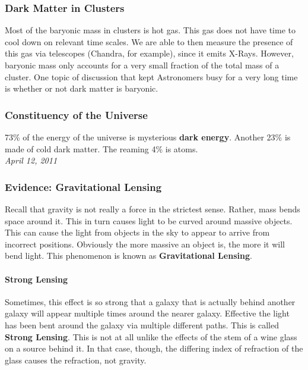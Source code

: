 \documentclass{article}
\begin{document}
	\subsubsection{Dark Matter in Clusters}
		Most of the baryonic mass in clusters is hot gas. This gas does not have time to cool down on relevant time scales. We are able to then measure the presence of this gas via telescopes (Chandra, for example), since it emits X-Rays. However, baryonic mass only accounts for a very small fraction of the total mass of a cluster. One topic of discussion that kept Astronomers busy for a very long time is whether or not dark matter is baryonic.
	\subsubsection{Constituency of the Universe}
	73\% of the energy of the universe is mysterious \textbf{dark energy}. Another 23\% is made of cold dark matter. The reaming 4\% is atoms.\\
	
	\noindent \textit{April 12, 2011}\\
	
	\subsubsection{Evidence: Gravitational Lensing}
	Recall that gravity is not really a force in the strictest sense. Rather, mass bends space around it. This in turn causes light to be curved around massive objects. This can cause the light from objects in the sky to appear to arrive from incorrect positions. Obviously the more massive an object is, the more it will bend light. This phenomenon is known as \textbf{Gravitational Lensing}.\\
	
	\paragraph{Strong Lensing} Sometimes, this effect is so strong that a galaxy that is actually behind another galaxy will appear multiple times around the nearer galaxy. Effective the light has been bent around the galaxy via multiple different paths. This is called \textbf{Strong Lensing}. This is not at all unlike the effects of the stem of a wine glass on a source behind it. In that case, though, the differing index of refraction of the glass causes the refraction, not gravity.\\
	
\end{document}
